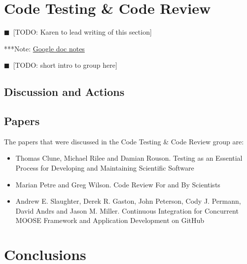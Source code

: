 \documentclass[11pt, oneside]{amsart}
\newcommand{\todo}[1]{{\color{blue}$\blacksquare$~\textsf{[TODO: #1]}}}
\newcommand{\note}[1]{ {\textcolor{blueish}    { ***Note:      #1 }}}
\begin{document}
\section{Code Testing \& Code Review} \label{sec:code_testing}
\todo{Karen to lead writing of this section}

\note{\href{http://tinyurl.com/l5t5h45}{Google doc notes}}

\todo{short intro to group here}

\subsection{Discussion and Actions}

\subsection{Papers}

The papers that were discussed in the Code Testing \& Code Review group are:
\begin{itemize}
\item Thomas Clune, Michael Rilee and Damian Rouson. Testing as an Essential
Process for Developing and Maintaining Scientific Software~\cite{wssspe2_clune}

\item Marian Petre and Greg Wilson. Code Review For and By
Scientists~\cite{wssspe2_petre}

\item Andrew E. Slaughter, Derek R. Gaston, John Peterson, Cody J. Permann,
David Andrs and Jason M. Miller. Continuous Integration for Concurrent {MOOSE}
Framework and Application Development on {GitHub}~\cite{wssspe2_slaughter}
\end{itemize}

\section{Conclusions} \label{sec:conclusions}
\end{document}
